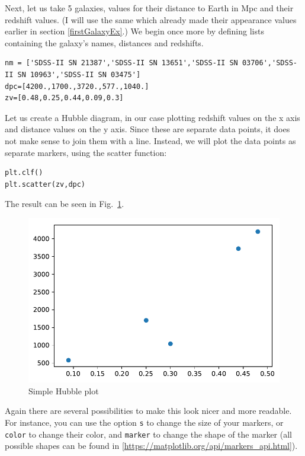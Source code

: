 \documentclass[twocolumn,apj]{openjournal}
\begin{document}
Next, let us take 5 galaxies, values for their distance to Earth in Mpc and their redshift values. (I will use the same which already made their appearance values earlier in section \ref{firstGalaxyEx}.) We begin once more by defining lists containing the galaxy's names, distances and redshifts.
\begin{lstlisting}
nm = ['SDSS-II SN 21387','SDSS-II SN 13651','SDSS-II SN 03706','SDSS-II SN 10963','SDSS-II SN 03475']
dpc=[4200.,1700.,3720.,577.,1040.]
zv=[0.48,0.25,0.44,0.09,0.3]
\end{lstlisting}
Let us create a Hubble diagram, in our case plotting redshift values on the x axis and distance values on the y axis. Since these are separate data points, it does not make sense to join them with a line. Instead, we will plot the data points as separate markers, using the scatter function:
\begin{lstlisting}
plt.clf()
plt.scatter(zv,dpc)
\end{lstlisting}
The result can be seen in Fig.~\ref{HubblePlot1}.
\begin{figure}[htbp]
\begin{center}
\includegraphics[width=\linewidth]{hubbleplot.pdf}
\caption{Simple Hubble plot}
\label{HubblePlot1}
\end{center}
\end{figure}
Again there are several possibilities to make this look nicer and more readable. For instance, you can use the option \verb|s| to change the size of your markers, or \verb|color| to change their color, and \verb|marker| to change the shape of the marker (all possible shapes can be found in [\href{https://matplotlib.org/api/markers_api.html}{https://matplotlib.org/api/markers\_api.html}]). 
\end{document}
